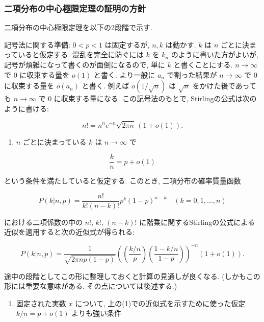 \documentclass[10pt, a4paper,xelatex,ja=standard]{bxjsarticle}
\providecommand{\tightlist}{%
      \setlength{\itemsep}{0pt}\setlength{\parskip}{0pt}}
\begin{document}
    \hypertarget{ux4e8cux9805ux5206ux5e03ux306eux4e2dux5fc3ux6975ux9650ux5b9aux7406ux306eux8a3cux660eux306eux65b9ux91dd}{%
\subsubsection{二項分布の中心極限定理の証明の方針}\label{ux4e8cux9805ux5206ux5e03ux306eux4e2dux5fc3ux6975ux9650ux5b9aux7406ux306eux8a3cux660eux306eux65b9ux91dd}}

二項分布の中心極限定理を以下の2段階で示す.

記号法に関する準備: \(0 < p < 1\) は固定するが, \(n, k\) は動かす. \(k\)
は \(n\) ごとに決まっていると仮定する. 混乱を完全に防ぐには \(k\) を
\(k_n\) のように書いた方がよいが,
記号が煩雑になって書くのが面倒になるので, 単に \(k\) と書くことにする.
\(n\to\infty\) で \(0\) に収束する量を \(o(1)\) と書く. より一般に
\(a_n\) で割った結果が \(n\to\infty\) で \(0\) に収束する量を \(o(a_n)\)
と書く. 例えば \(o\left(1/\sqrt{n}\right)\) は \(\sqrt{n}\)
をかけた後であっても \(n\to\infty\) で \(0\) に収束する量になる.
この記号法のもとで, Stirlingの公式は次のように書ける:

\[
n! = n^n e^{-n} \sqrt{2\pi n}\,(1 + o(1)).
\]

\begin{enumerate}
\def\labelenumi{(\arabic{enumi})}
\tightlist
\item
  \(n\) ごとに決まっている \(k\) は \(n\to\infty\) で
\end{enumerate}

\[
\frac{k}{n} = p + o(1)
\]

という条件を満たしていると仮定する. このとき, 二項分布の確率質量函数

\[
P(k|n,p) = \frac{n!}{k!(n-k)!} p^k(1-p)^{n-k} \quad (k=0,1,\ldots,n)
\]

における二項係数の中の \(n!\), \(k!\), \((n-k)!\)
に階乗に関するStirlingの公式による近似を適用すると次の近似式が得られる:

\[
P(k|n,p) = \frac{1}{\sqrt{2\pi np(1-p)}}
\left(\left(\frac{k/n}{p}\right)\left(\frac{1-k/n}{1-p}\right)\right)^{-n}(1 + o(1)).
\]

途中の段階としてこの形に整理しておくと計算の見通しが良くなる.
(しかもこの形には重要な意味がある. その点については後述する.)

\begin{enumerate}
\def\labelenumi{(\arabic{enumi})}
\setcounter{enumi}{1}
\tightlist
\item
  固定された実数 \(x\) について, 上の(1)での近似式を示すために使った仮定
  \(k/n = p + o(1)\) よりも強い条件
\end{enumerate}
\end{document}
